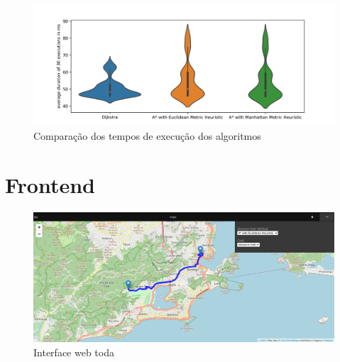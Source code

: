 \documentclass{article}
\begin{document}
\begin{figure}[H]
    \centering
    \includegraphics[scale=0.63]{EDA_benchmark_violinplot.png}
    \caption{Comparação dos tempos de execução dos algoritmos}
    \label{fig1}
\end{figure}

\section{Frontend}

\begin{figure}[H]
    \centering
    \includegraphics[scale=0.5]{EDA_full_inteface_web.png}
    \caption{Interface web toda}
    \label{fig2}
\end{figure}
\end{document}
